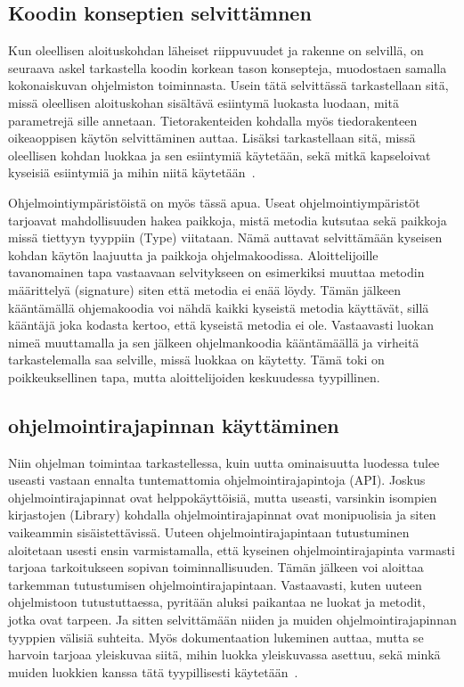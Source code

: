 \documentclass[finnish]{../tktltiki2}
\theoremstyle{definition}
\theoremstyle{remark}
\begin{document}
\subsection{Koodin konseptien selvittämnen}
Kun oleellisen aloituskohdan läheiset riippuvuudet ja rakenne on selvillä, on seuraava askel tarkastella koodin korkean tason konsepteja, muodostaen samalla kokonaiskuvan ohjelmiston toiminnasta. Usein tätä selvittässä tarkastellaan sitä, missä oleellisen aloituskohan sisältävä esiintymä luokasta luodaan, mitä parametrejä sille annetaan. Tietorakenteiden kohdalla myös tiedorakenteen oikeaoppisen käytön selvittäminen auttaa. Lisäksi tarkastellaan sitä, missä oleellisen kohdan luokkaa ja sen esiintymiä käytetään, sekä mitkä kapseloivat kyseisiä esiintymiä ja mihin niitä käytetään~\cite{questions-during-software-evolution-tasks,eliciting-design-requirements-for-maintenance-oriented-ides}.

Ohjelmointiympäristöistä on myös tässä apua. Useat ohjelmointiympäristöt tarjoavat mahdollisuuden hakea paikkoja, mistä metodia kutsutaa sekä paikkoja missä tiettyyn tyyppiin (Type) viitataan. Nämä auttavat selvittämään kyseisen kohdan käytön laajuutta ja paikkoja ohjelmakoodissa. Aloittelijoille tavanomainen tapa vastaavaan selvitykseen on esimerkiksi muuttaa metodin määrittelyä (signature) siten että metodia ei enää löydy. Tämän jälkeen kääntämällä ohjemakoodia voi nähdä kaikki kyseistä metodia käyttävät, sillä kääntäjä joka kodasta kertoo, että kyseistä metodia ei ole. Vastaavasti luokan nimeä muuttamalla ja sen jälkeen ohjelmankoodia kääntämäällä ja virheitä tarkastelemalla saa selville, missä luokkaa on käytetty. Tämä toki on poikkeuksellinen tapa, mutta aloittelijoiden keskuudessa tyypillinen.

\subsection{ohjelmointirajapinnan käyttäminen}
Niin ohjelman toimintaa tarkastellessa, kuin uutta ominaisuutta luodessa tulee useasti vastaan ennalta tuntemattomia ohjelmointirajapintoja (API). Joskus ohjelmointirajapinnat ovat helppokäyttöisiä, mutta useasti, varsinkin isompien kirjastojen (Library) kohdalla ohjelmointirajapinnat ovat monipuolisia ja siten vaikeammin sisäistettävissä.
Uuteen ohjelmointirajapintaan tutustuminen aloitetaan usesti ensin varmistamalla, että kyseinen ohjelmointirajapinta varmasti tarjoaa tarkoitukseen sopivan toiminnallisuuden. Tämän jälkeen voi aloittaa tarkemman tutustumisen ohjelmointirajapintaan.
Vastaavasti, kuten uuteen ohjelmistoon tutustuttaessa, pyritään aluksi paikantaa ne luokat ja metodit, jotka ovat tarpeen. Ja sitten selvittämään niiden ja muiden ohjelmointirajapinnan tyyppien välisiä suhteita. Myös dokumentaation lukeminen auttaa, mutta se harvoin tarjoaa yleiskuvaa siitä, mihin luokka yleiskuvassa asettuu, sekä minkä muiden luokkien kanssa tätä tyypillisesti käytetään~\cite{asking-and-answering-api-questions}.
\end{document}
